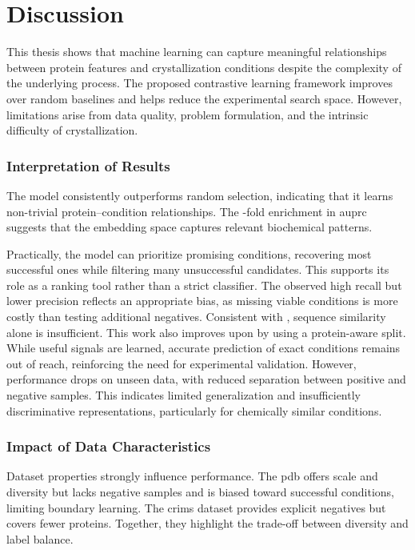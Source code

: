 \chapter{Discussion} \label{chapter:discussion} 

This thesis shows that machine learning can capture meaningful relationships between protein features and crystallization conditions despite the complexity of the underlying process. The proposed contrastive learning framework improves over random baselines and helps reduce the experimental search space. However, limitations arise from data quality, problem formulation, and the intrinsic difficulty of crystallization.

\subsection*{Interpretation of Results}

The model consistently outperforms random selection, indicating that it learns non-trivial protein–condition relationships. The -fold enrichment in \gls{auprc} suggests that the embedding space captures relevant biochemical patterns.

Practically, the model can prioritize promising conditions, recovering most successful ones while filtering many unsuccessful candidates. This supports its role as a ranking tool rather than a strict classifier. The observed high recall but lower precision reflects an appropriate bias, as missing viable conditions is more costly than testing additional negatives.
Consistent with \citet{Abrahams2019}, sequence similarity alone is insufficient. This work also improves upon \citet{Lee2019} by using a protein-aware split. While useful signals are learned, accurate prediction of exact conditions remains out of reach, reinforcing the need for experimental validation.
However, performance drops on unseen data, with reduced separation between positive and negative samples. This indicates limited generalization and insufficiently discriminative representations, particularly for chemically similar conditions.


\subsection*{Impact of Data Characteristics}

Dataset properties strongly influence performance. The \gls{pdb} offers scale and diversity but lacks negative samples and is biased toward successful conditions, limiting boundary learning. The \gls{crims} dataset provides explicit negatives but covers fewer proteins. Together, they highlight the trade-off between diversity and label balance.

